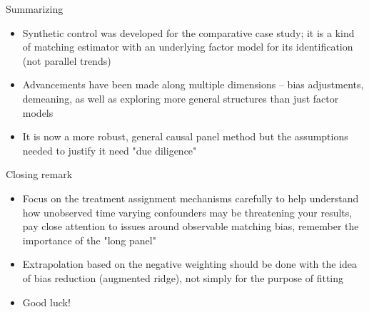 \documentclass{beamer}
\begin{document}
\begin{frame}{Summarizing}


\begin{itemize}

\item Synthetic control was developed for the comparative case study; it is a kind of matching estimator with an underlying factor model for its identification (not parallel trends)
\item Advancements have been made along multiple dimensions -- bias adjustments, demeaning, as well as exploring more general structures than just factor models
\item It is now a more robust, general causal panel method but the assumptions needed to justify it need "due diligence" 

\end{itemize}

\end{frame}

\begin{frame}{Closing remark}

\begin{itemize}
\item Focus on the treatment assignment mechanisms carefully to help understand how unobserved time varying confounders may be threatening your results, pay close attention to issues around observable matching bias, remember the importance of the "long panel"
\item Extrapolation based on the negative weighting should be done with the idea of bias reduction (augmented ridge), not simply for the purpose of fitting
\item Good luck!

\end{itemize}

\end{frame}
\end{document}
